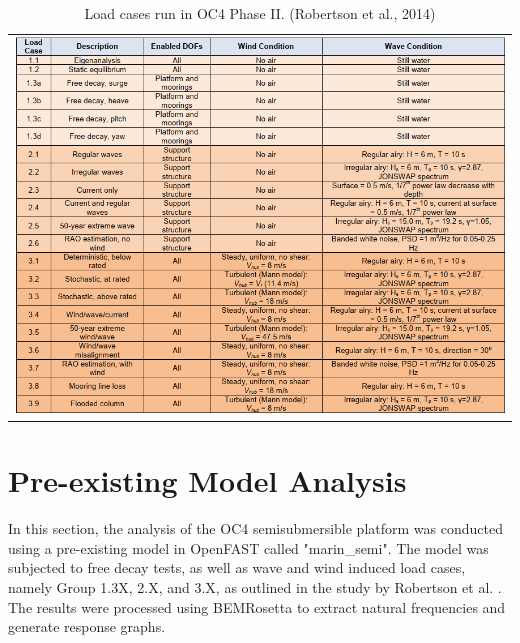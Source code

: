 \documentclass[a4paper, 11pt]{article}
\begin{document}
\begin{table}[H]
    \centering
    \caption{Load cases run in OC4 Phase II. (Robertson et al., 2014)}
    \label{tab:image_table}
    \begin{tabular}{c}
        \includegraphics[width=1\textwidth]{table_3.png} \\
    \end{tabular}
\end{table}


\section{Pre-existing Model Analysis}

\hspace*{0.5cm}In this section, the analysis of the OC4 semisubmersible platform was conducted using a pre-existing model in OpenFAST called "marin\_semi". The model was subjected to free decay tests, as well as  wave and wind induced load cases, namely Group 1.3X, 2.X, and 3.X, as outlined in the study by Robertson et al. \cite{Robertson2014}. The results were processed using BEMRosetta to extract natural frequencies and generate response graphs.
\end{document}
